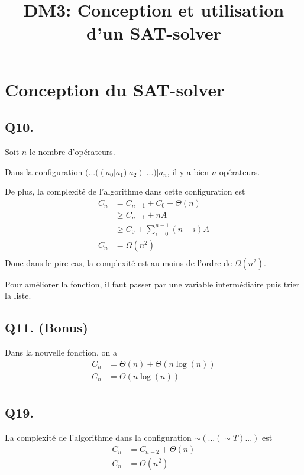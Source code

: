 

\title{DM3: Conception et utilisation d’un SAT-solver}
\author{}
\date{}



\maketitle
\section{Conception du SAT-solver}
\subsection*{Q10.}
Soit $n$ le nombre d'opérateurs.

Dans la configuration $(...((a_0 | a_1) | a_2) | ...) | a_n$,
il y a bien $n$ opérateurs.

De plus, la complexité de l'algorithme dans cette configuration est
\begin{align*}
    C_n &= C_{n-1} + C_0 + \Theta(n)\\
    &\geq C_{n-1} + nA\\
    &\geq C_0 + \sum_{i=0}^{n-1}(n-i)A\\
    C_n &= \boxed{\Omega(n^2)}\\
\end{align*}
Donc dans le pire cas, la complexité est au moins de l’ordre de $\Omega(n^2)$.

Pour améliorer la fonction, il faut passer par une variable intermédiaire puis
trier la liste.

\subsection*{Q11. (Bonus)}
Dans la nouvelle fonction, on a
\begin{align*}
    C_n &= \Theta(n) + \Theta(n\log(n))\\
    C_n &= \boxed{\Theta(n\log(n))}\\
\end{align*}

\subsection*{Q19.}
La complexité de l’algorithme dans la configuration $\sim(...(\sim T)...)$ est
\begin{align*}
    C_n &= C_{n-2} + \Theta(n)\\
    C_n &= \boxed{\Theta(n^2)}\\
\end{align*}

